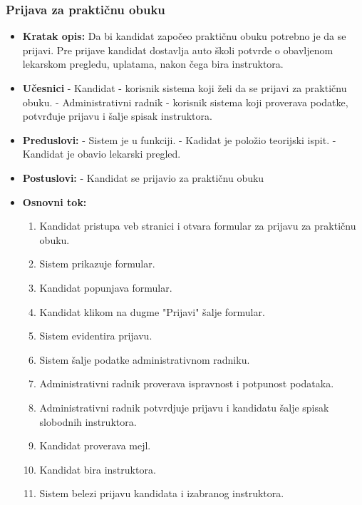 \subsubsection{Prijava za praktičnu obuku}

\vspace{3mm}

\begin{itemize}

\item \textbf{Kratak opis:} Da bi kandidat započeo praktičnu obuku potrebno je da se prijavi. Pre prijave kandidat dostavlja auto školi potvrde o obavljenom lekarskom pregledu, uplatama, nakon čega bira instruktora.

\vspace{2mm}

\item \textbf{Učesnici} \newline
   - Kandidat - korisnik sistema koji želi da se prijavi za praktičnu obuku.\newline 
   - Administrativni radnik - korisnik sistema koji proverava podatke, potvrđuje prijavu i šalje spisak instruktora.

\item \textbf{Preduslovi:} \newline
   - Sistem je u funkciji. \newline
   - Kadidat je položio teorijski ispit. \newline 
   - Kandidat je obavio lekarski pregled. 

\item \textbf{Postuslovi:} \newline
    - Kandidat se prijavio za praktičnu obuku 

\item \textbf{Osnovni tok:}  
   \begin{enumerate}
   \item Kandidat pristupa veb stranici i otvara formular za prijavu za praktičnu obuku.
   \item Sistem prikazuje formular.
   \item Kandidat popunjava formular.
   \item Kandidat klikom na dugme "Prijavi" šalje formular.
   \item Sistem evidentira prijavu.
   \item Sistem šalje podatke administrativnom radniku.
   \item Administrativni radnik proverava ispravnost i potpunost podataka.
   \item Administrativni radnik potvrdjuje prijavu i kandidatu šalje spisak slobodnih instruktora.
   \item Kandidat proverava mejl.
   \item Kandidat bira instruktora.
   \item Sistem belezi prijavu kandidata i izabranog instruktora.
   \end{enumerate}


\end{itemize}

